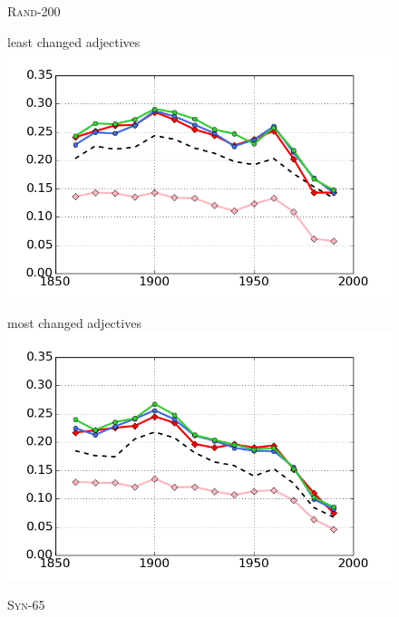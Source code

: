 \documentclass[output=paper]{langsci/langscibook}
\begin{document}
\begin{figure}[p]
\begin{center}
    \textsc{Rand-200}
\end{center}

\begin{minipage}{.5\textwidth}
   least changed adjectives
  \includegraphics[width=.95\linewidth]{figures/GREWAL_rand200_least_changed.png}
\end{minipage}\begin{minipage}{.5\textwidth}
   most changed adjectives
  \includegraphics[width=.95\linewidth]{figures/GREWAL_rand200_most_changed.png}
\end{minipage}

\begin{center}
    \textsc{Syn-65}
\end{center}


\end{figure}
\end{document}
